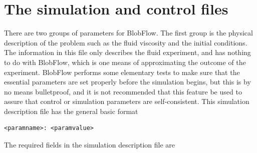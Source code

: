 \documentclass[12pt]{report}
\newcommand{\BF}{BlobFlow}
\begin{document}
\section{The simulation and control files}

There are two groups of parameters for \BF.  The first group is the
physical description of the problem such as the fluid viscosity and the
initial conditions.  The information in this file only describes the fluid
experiment, and has nothing to do with \BF, which is one means of
approximating the outcome of the experiment.  BlobFlow performs some
elementary tests to make sure that the essential parameters are set
properly before the simulation begins, but this is by no means
bulletproof, and it is not recommended that this feature be used to
assure that control or simulation parameters are self-consistent.
This simulation description file has the general basic format
\begin{verbatim}
<paramname>: <paramvalue>
\end{verbatim}
The required fields in the simulation description file are
\end{document}
